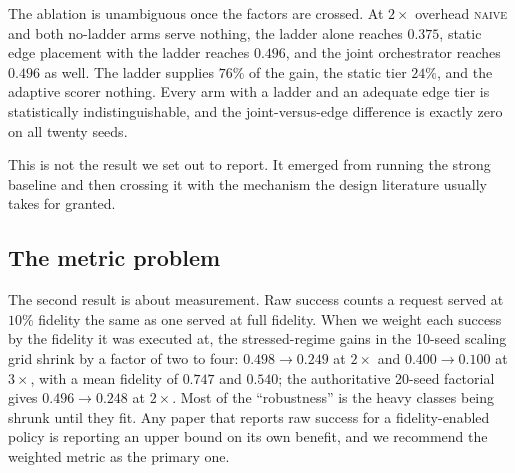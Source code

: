 \documentclass[journal,10pt]{IEEEtran}
\begin{document}
The ablation is unambiguous once the factors are crossed. At $2\times$
overhead \textsc{naive} and both no-ladder arms serve nothing, the ladder alone
reaches $0.375$, static edge placement with the ladder reaches $0.496$, and the
joint orchestrator reaches $0.496$ as well. The ladder supplies $76\%$ of the
gain, the static tier $24\%$, and the adaptive scorer nothing. Every arm with a
ladder and an adequate edge tier is statistically indistinguishable, and the
joint-versus-edge difference is exactly zero on all twenty seeds.

This is not the result we set out to report. It emerged from running the strong
baseline and then crossing it with the mechanism the design literature usually
takes for granted.

\subsection{The metric problem}
The second result is about measurement. Raw success counts a request served at
$10\%$ fidelity the same as one served at full fidelity. When we weight each
success by the fidelity it was executed at, the stressed-regime gains in the
10-seed scaling grid shrink by a factor of two to four: $0.498\to0.249$ at
$2\times$ and $0.400\to0.100$ at $3\times$, with a mean fidelity of $0.747$ and
$0.540$; the authoritative 20-seed factorial gives $0.496\to0.248$ at $2\times$. Most of the
``robustness'' is the heavy classes being shrunk until they fit. Any paper that
reports raw success for a fidelity-enabled policy is reporting an upper bound on
its own benefit, and we recommend the weighted metric as the primary one.
\end{document}

